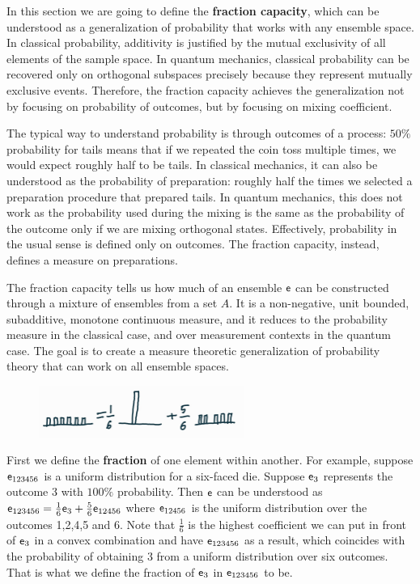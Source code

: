 In this section we are going to define the \textbf{fraction capacity}, which can be understood as a generalization of probability that works with any ensemble space. In classical probability, additivity is justified by the mutual exclusivity of all elements of the sample space. In quantum mechanics, classical probability can be recovered only on orthogonal subspaces precisely because they represent mutually exclusive events. Therefore, the fraction capacity achieves the generalization not by focusing on probability of outcomes, but by focusing on mixing coefficient.


The typical way to understand probability is through outcomes of a process: $50\%$ probability for tails means that if we repeated the coin toss multiple times, we would expect roughly half to be tails. In classical mechanics, it can also be understood as the probability of preparation: roughly half the times we selected a preparation procedure that prepared tails. In quantum mechanics, this does not work as the probability used during the mixing is the same as the probability of the outcome only if we are mixing orthogonal states. Effectively, probability in the usual sense is defined only on outcomes. The fraction capacity, instead, defines a measure on preparations.

The fraction capacity tells us how much of an ensemble $\mathsf{e}$ can be constructed through a mixture of ensembles from a set $A$. It is a non-negative, unit bounded, subadditive, monotone continuous measure, and it reduces to the probability measure in the classical case, and over measurement contexts in the quantum case. The goal is to create a measure theoretic generalization of probability theory that can work on all ensemble spaces.

\begin{figure}[h]
	\centering
	\includegraphics[width=0.6\textwidth]{tempimages/Fraction.jpg}
\end{figure}

First we define the \textbf{fraction} of one element within another. For example, suppose $\mathsf{e}_{123456}$ is a uniform distribution for a six-faced die. Suppose $\mathsf{e}_3$ represents the outcome 3 with $100\%$ probability. Then $\mathsf{e}$ can be understood as $\mathsf{e}_{123456} = \frac{1}{6} \mathsf{e}_3 + \frac{5}{6} \mathsf{e}_{12456}$ where $\mathsf{e}_{12456}$ is the uniform distribution over the outcomes 1,2,4,5 and 6. Note that $\frac{1}{6}$ is the highest coefficient we can put in front of $\mathsf{e}_3$ in a convex combination and have $\mathsf{e}_{123456}$ as a result, which coincides with the probability of obtaining 3 from a uniform distribution over six outcomes. That is what we define the fraction of $\mathsf{e}_3$ in $\mathsf{e}_{123456}$ to be.

